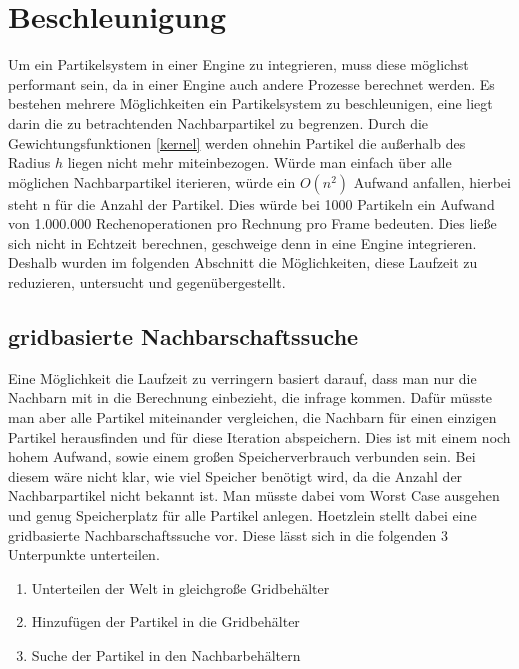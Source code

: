 \documentclass[intern,palatino]{cgBA}
\begin{document}
\section{Beschleunigung}\label{besch}

Um ein Partikelsystem in einer Engine zu integrieren, muss diese möglichst performant sein, da in einer Engine auch andere Prozesse berechnet werden. Es bestehen mehrere Möglichkeiten ein Partikelsystem zu beschleunigen, eine liegt darin die zu betrachtenden Nachbarpartikel zu begrenzen. Durch die Gewichtungsfunktionen \ref{kernel} werden ohnehin Partikel die außerhalb des Radius $h$ liegen nicht mehr miteinbezogen. Würde man einfach über alle möglichen Nachbarpartikel iterieren, würde ein $O(n^2)$ Aufwand anfallen, hierbei steht n für die Anzahl der Partikel. Dies würde bei 1000 Partikeln ein Aufwand von 1.000.000 Rechenoperationen pro Rechnung pro Frame bedeuten. Dies ließe sich nicht in Echtzeit berechnen, geschweige denn in eine Engine integrieren. Deshalb wurden im folgenden Abschnitt die Möglichkeiten, diese Laufzeit zu reduzieren, untersucht und gegenübergestellt.  


\subsection{gridbasierte Nachbarschaftssuche}\label{nachbar}

Eine Möglichkeit die Laufzeit zu verringern basiert darauf, dass man nur die Nachbarn mit in die Berechnung einbezieht, die infrage kommen. Dafür müsste man aber alle Partikel miteinander vergleichen, die Nachbarn für einen einzigen Partikel herausfinden und für diese Iteration abspeichern. Dies ist mit einem noch hohem Aufwand, sowie einem großen Speicherverbrauch verbunden sein. Bei diesem wäre nicht klar, wie viel Speicher benötigt wird, da die Anzahl der Nachbarpartikel nicht bekannt ist. Man müsste dabei vom Worst Case ausgehen und genug Speicherplatz für alle Partikel anlegen.
\newline
Hoetzlein \cite{nvidia} stellt dabei eine gridbasierte Nachbarschaftssuche vor. Diese lässt sich in die folgenden 3 Unterpunkte unterteilen.

\begin{enumerate}
	\item Unterteilen der Welt in gleichgroße Gridbehälter
	\item Hinzufügen der Partikel in die Gridbehälter
	\item Suche der Partikel in den Nachbarbehältern 
\end{enumerate}
\end{document}
